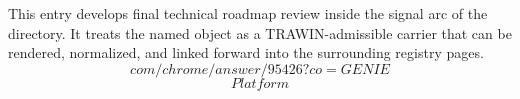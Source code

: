 
\begin{tzpsnapshot}
\end{tzpsnapshot}

This entry develops final technical roadmap review inside the signal arc of the directory. It treats the named object as a TRAWIN-admissible carrier that can be rendered, normalized, and linked forward into the surrounding registry pages.
\[
com/chrome/answer/95426?co=GENIE
\]
\[
Platform%
\]

